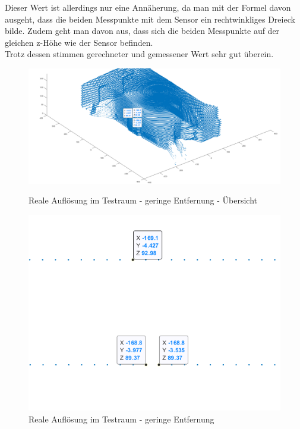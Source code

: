 Dieser Wert ist allerdings nur eine Annäherung, da man mit der Formel davon ausgeht, dass die beiden Messpunkte mit dem Sensor ein rechtwinkliges Dreieck bilde. Zudem geht man davon aus, dass sich die beiden Messpunkte auf der gleichen z-Höhe wie der Sensor befinden.\\
Trotz dessen stimmen gerechneter und gemessener Wert sehr gut überein.   
\begin{figure}[H]
	\centering
	\begin{minipage}[t]{0.45\linewidth}
		\centering
		\includegraphics[width=1.2\linewidth]{images/Validierung/Aufloesungen/3Messwerte_Ansicht.png}
		\caption{Reale Auflösung im Testraum - geringe Entfernung - Übersicht}
		\label{realeAuslösung1_Übersicht}
	\end{minipage}
	\hfill
	\begin{minipage}[t]{0.45\linewidth}
		\centering
		\includegraphics[width=1.2\linewidth]{images/Validierung/Aufloesungen/3Label.png}
		\caption{Reale Auflösung im Testraum - geringe Entfernung}
		\label{realeAuslösung1}
	\end{minipage}
\end{figure}




